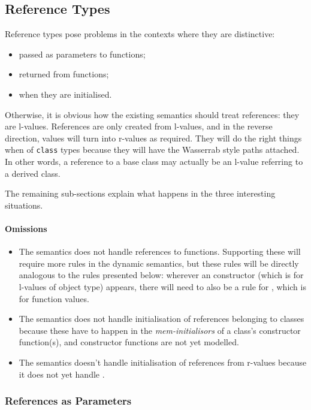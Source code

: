 \documentclass[11pt]{article}
\begin{document}
\subsection{Reference Types}
\label{sec:reftypes}

Reference types pose problems in the contexts where they are
distinctive:
\begin{itemize}
\item passed as parameters to functions;
\item returned from functions;
\item when they are initialised.
\end{itemize}

Otherwise, it is obvious how the existing semantics should treat
references: they are l-values.  References are only created from
l-values, and in the reverse direction, values will turn into r-values
as required.  They will do the right things when of \texttt{class}
types because they will have the Wasserrab style paths attached.  In
other words, a reference to a base class may actually be an l-value
referring to a derived class.

The remaining sub-sections explain what happens in the three
interesting situations.

\paragraph{Omissions}
\begin{itemize}
\item The semantics does not handle references to functions.
  Supporting these will require more rules in the dynamic semantics,
  but these rules will be directly analogous to the rules presented
  below: wherever an \clvalue{} constructor (which is for l-values of
  object type) appears, there will need to also be a rule for
  \cfvalue{}, which is for function values.
\item The semantics does not handle initialisation of references
  belonging to classes because these have to happen in the
  \emph{mem-initialisors} of a class's constructor function(s), and
  constructor functions are not yet modelled.
\item The semantics doesn't handle initialisation of 
  references from r-values because it does not yet handle
  .
\end{itemize}


\subsubsection{References as Parameters}
\end{document}
